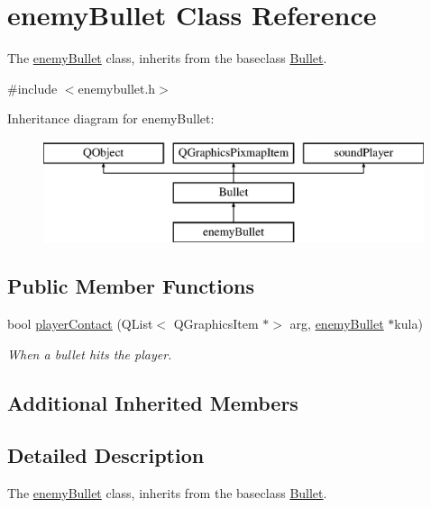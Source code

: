\hypertarget{classenemyBullet}{}\section{enemy\+Bullet Class Reference}
\label{classenemyBullet}


The \hyperlink{classenemyBullet}{enemy\+Bullet} class, inherits from the baseclass \hyperlink{classBullet}{Bullet}.  




{\ttfamily \#include $<$enemybullet.\+h$>$}

Inheritance diagram for enemy\+Bullet\+:\begin{figure}[H]
\begin{center}
\leavevmode
\includegraphics[height=3.000000cm]{classenemyBullet}
\end{center}
\end{figure}
\subsection*{Public Member Functions}
\begin{DoxyCompactItemize}
\item 
bool \hyperlink{classenemyBullet_a2e2e8de44bed2bff6b949b39a61efba9}{player\+Contact} (Q\+List$<$ Q\+Graphics\+Item $\ast$$>$ arg, \hyperlink{classenemyBullet}{enemy\+Bullet} $\ast$kula)
\begin{DoxyCompactList}\small\item\em When a bullet hits the player. \end{DoxyCompactList}\end{DoxyCompactItemize}
\subsection*{Additional Inherited Members}


\subsection{Detailed Description}
The \hyperlink{classenemyBullet}{enemy\+Bullet} class, inherits from the baseclass \hyperlink{classBullet}{Bullet}. 

